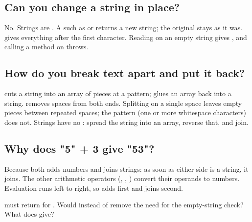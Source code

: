 \label{ch:c04}

\subsection{Can you change a string in place?}%
No. Strings are . A  such as  or  returns a new string; the original stays as it was.  gives everything after the first character. Reading  on an empty string gives , and calling a method on  throws.

\subsection{How do you break text apart and put it back?}%
 cuts a string into an array of pieces at a pattern;  glues an array back into a string.  removes spaces from both ends. Splitting on a single space leaves empty pieces between repeated spaces; the pattern  (one or more whitespace characters) does not. Strings have no : spread the string into an array, reverse that, and join.

\subsection{Why does "5" + 3 give "53"?}%
Because \code{+} both adds numbers and joins strings: as soon as either side is a string, it joins. The other arithmetic operators (\code{-}, \code{*}, \code{/}) convert their operands to numbers. Evaluation runs left to right, so  adds first and joins second.

\begin{ponder} must return  for . Would  instead of  remove the need for the empty-string check? What does  give?\end{ponder}
